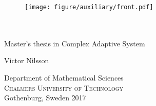 
\begin{titlepage}

\addtolength{\voffset}{2cm}

\begin{figure}[H]
\centering
\vspace{1cm}	%
\texttt{[image: figure/auxiliary/front.pdf]}
\end{figure}

\mbox{}
\vfill
\renewcommand{\familydefault}{\sfdefault} \normalfont %
\textbf{{\Huge 	\titlename}} 	\\[0.5cm]
{\Large \subtitlename}\\[0.3cm]
Master's thesis in Complex Adaptive System \setlength{\parskip}{1cm}

{\Large Victor Nilsson} %

Department of Mathematical Sciences \\
\textsc{Chalmers University of Technology} \\
Gothenburg, Sweden 2017

\renewcommand{\familydefault}{\rmdefault} \normalfont %
\end{titlepage}


\newpage
\restoregeometry
\thispagestyle{empty}
\mbox{}


